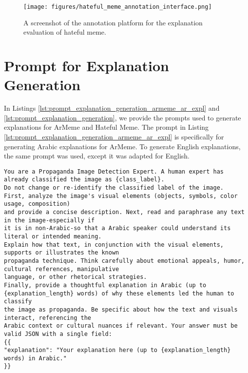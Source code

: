 \begin{figure*}[htb!]
    \centering
    \texttt{[image: figures/hateful\_meme\_annotation\_interface.png]}
    \caption{A screenshot of the annotation platform for the explanation evaluation of hateful meme.}
    \label{fig:hateful_meme_annotation_interface}
\end{figure*}


\section{Prompt for Explanation Generation}
\label{sec:app_prompt}
In Listings \ref{lst:prompt_explanation_generation_armeme_ar_expl} and \ref{lst:prompt_explanation_generation}, we provide the prompts used to generate explanations for ArMeme and Hateful Meme. The prompt in Listing \ref{lst:prompt_explanation_generation_armeme_ar_expl} is specifically for generating Arabic explanations for ArMeme. To generate English explanations, the same prompt was used, except it was adapted for English. 

\begin{lstlisting}[caption={Prompt for generating Arabic explanation for ArMeme dataset. The place-holders refers to label, and number of words, respectively.},label={lst:prompt_explanation_generation_armeme_ar_expl}]
You are a Propaganda Image Detection Expert. A human expert has already classified the image as {class_label}. 
Do not change or re-identify the classified label of the image.
First, analyze the image's visual elements (objects, symbols, color usage, composition) 
and provide a concise description. Next, read and paraphrase any text in the image-especially if 
it is in non-Arabic-so that a Arabic speaker could understand its literal or intended meaning. 
Explain how that text, in conjunction with the visual elements, supports or illustrates the known 
propaganda technique. Think carefully about emotional appeals, humor, cultural references, manipulative 
language, or other rhetorical strategies.
Finally, provide a thoughtful explanation in Arabic (up to {explanation_length} words) of why these elements led the human to classify 
the image as propaganda. Be specific about how the text and visuals interact, referencing the 
Arabic context or cultural nuances if relevant. Your answer must be valid JSON with a single field:
{{
"explanation": "Your explanation here (up to {explanation_length} words) in Arabic."
}}
\end{lstlisting}

